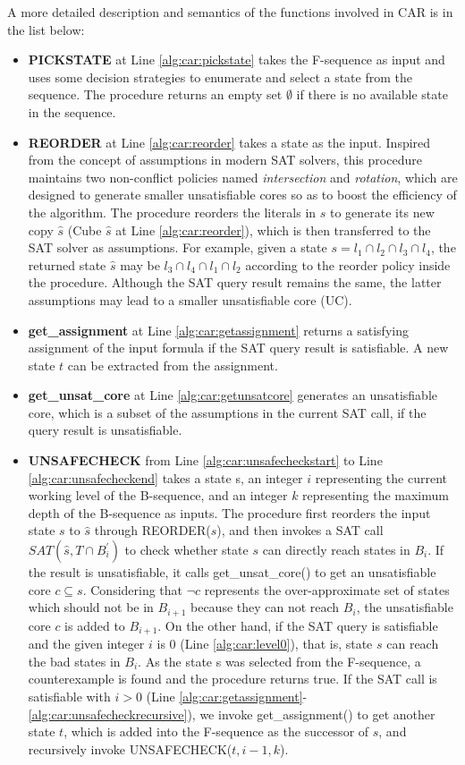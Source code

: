 A more detailed description and semantics of the functions involved in CAR is in the list below:
\fi

\begin{itemize}
    \item \textbf{PICKSTATE} at Line \ref{alg:car:pickstate} takes the F-sequence as input and uses some decision strategies to enumerate and select a state from the sequence. The procedure returns an empty set $\emptyset$ if there is no available state in the sequence.
    \item \textbf{REORDER} at Line \ref{alg:car:reorder} takes a state as the input. Inspired from the concept of assumptions in modern SAT solvers, this procedure maintains two non-conflict policies named \emph{intersection} and \emph{rotation}, which are designed to generate smaller unsatisfiable cores so as to boost the efficiency of the algorithm. The procedure reorders the literals in $s$ to generate its new copy $\hat{s}$ (Cube $\hat{s}$ at Line \ref{alg:car:reorder}), which is then transferred to the SAT solver as assumptions. For example, given a state $s=l_{1}\cap l_{2}\cap l_{3}\cap l_{4}$, the returned state $\hat{s}$ may be $l_{3}\cap l_{4}\cap l_{1}\cap l_{2}$ according to the reorder policy inside the procedure. Although the SAT query result remains the same, the latter assumptions may lead to a  smaller unsatisfiable core (UC). 
    \item \textbf{get\_assignment} at Line \ref{alg:car:getassignment} returns a satisfying assignment of the input formula if the SAT query result is satisfiable. A new state $t$ can be extracted from the assignment.
    \item \textbf{get\_unsat\_core} at Line \ref{alg:car:getunsatcore} generates an unsatisfiable core, which is a subset of the assumptions in the current SAT call, if the query result is unsatisfiable.
    \item \textbf{UNSAFECHECK} from Line \ref{alg:car:unsafecheckstart} to Line \ref{alg:car:unsafecheckend} takes a state s, an integer $i$ representing the current working level of the B-sequence, and an integer $k$ representing the maximum depth of the B-sequence as inputs. The procedure first reorders the input state $s$ to $\hat{s}$ through REORDER($s$), and then invokes a SAT call $\mathit{SAT}(\hat{s},T\cap B^{'}_{i})$ to check whether state $s$ can directly reach states in $B_{i}$. If the result is unsatisfiable, it calls get\_unsat\_core() to get an unsatisfiable core $c \subseteq s$. Considering that $\neg c$ represents the over-approximate set of states which should not be in $B_{i+1}$ because they can not reach $B_{i}$, the unsatisfiable core $c$ is added to $B_{i+1}$. On the other hand, if the SAT query is satisfiable and the given integer $i$ is 0 (Line \ref{alg:car:level0}), that is, state $s$ can reach the bad states in $B_{i}$. As the state s was selected from the F-sequence, a counterexample is found and the procedure returns true. If the SAT call is satisfiable with $i>0$ (Line \ref{alg:car:getassignment}-\ref{alg:car:unsafecheckrecursive}), we invoke get\_assignment() to get another state $t$, which is added into the F-sequence as the successor of $s$, and recursively invoke UNSAFECHECK($t,i-1,k$). 

\end{itemize}
